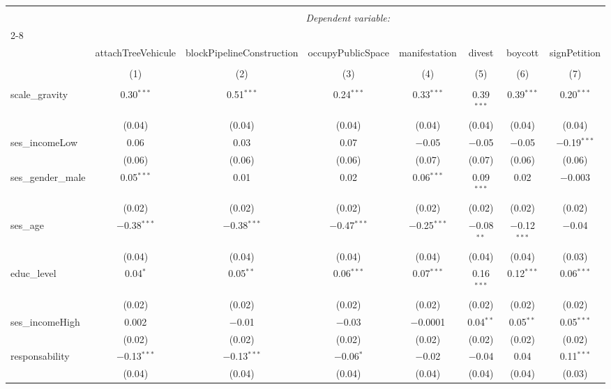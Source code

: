 \documentclass[
]{article}
\begin{document}
\begin{sidewaystable}[!htbp] \centering 
  \caption{Interaction pauvreté-préoccupations 2} 
  \label{} 
\begin{tabular}{@{\extracolsep{1pt}}lccccccc} 
\\[-1.8ex]\hline 
\hline \\[-1.8ex] 
 & \multicolumn{7}{c}{\textit{Dependent variable:}} \\ 
\cline{2-8} 
\\[-1.8ex] & attachTreeVehicule & blockPipelineConstruction & occupyPublicSpace & manifestation & divest & boycott & signPetition \\ 
\\[-1.8ex] & (1) & (2) & (3) & (4) & (5) & (6) & (7)\\ 
\hline \\[-1.8ex] 
 scale\_gravity & 0.30$^{***}$ & 0.51$^{***}$ & 0.24$^{***}$ & 0.33$^{***}$ & 0.39$^{***}$ & 0.39$^{***}$ & 0.20$^{***}$ \\ 
  & (0.04) & (0.04) & (0.04) & (0.04) & (0.04) & (0.04) & (0.04) \\ 
  ses\_incomeLow & 0.06 & 0.03 & 0.07 & $-$0.05 & $-$0.05 & $-$0.05 & $-$0.19$^{***}$ \\ 
  & (0.06) & (0.06) & (0.06) & (0.07) & (0.07) & (0.06) & (0.06) \\ 
  ses\_gender\_male & 0.05$^{***}$ & 0.01 & 0.02 & 0.06$^{***}$ & 0.09$^{***}$ & 0.02 & $-$0.003 \\ 
  & (0.02) & (0.02) & (0.02) & (0.02) & (0.02) & (0.02) & (0.02) \\ 
  ses\_age & $-$0.38$^{***}$ & $-$0.38$^{***}$ & $-$0.47$^{***}$ & $-$0.25$^{***}$ & $-$0.08$^{**}$ & $-$0.12$^{***}$ & $-$0.04 \\ 
  & (0.04) & (0.04) & (0.04) & (0.04) & (0.04) & (0.04) & (0.03) \\ 
  educ\_level & 0.04$^{*}$ & 0.05$^{**}$ & 0.06$^{***}$ & 0.07$^{***}$ & 0.16$^{***}$ & 0.12$^{***}$ & 0.06$^{***}$ \\ 
  & (0.02) & (0.02) & (0.02) & (0.02) & (0.02) & (0.02) & (0.02) \\ 
  ses\_incomeHigh & 0.002 & $-$0.01 & $-$0.03 & $-$0.0001 & 0.04$^{**}$ & 0.05$^{**}$ & 0.05$^{***}$ \\ 
  & (0.02) & (0.02) & (0.02) & (0.02) & (0.02) & (0.02) & (0.02) \\ 
  responsability & $-$0.13$^{***}$ & $-$0.13$^{***}$ & $-$0.06$^{*}$ & $-$0.02 & $-$0.04 & 0.04 & 0.11$^{***}$ \\ 
  & (0.04) & (0.04) & (0.04) & (0.04) & (0.04) & (0.04) & (0.03) \\ 

\end{tabular}
\end{sidewaystable}
\end{document}
